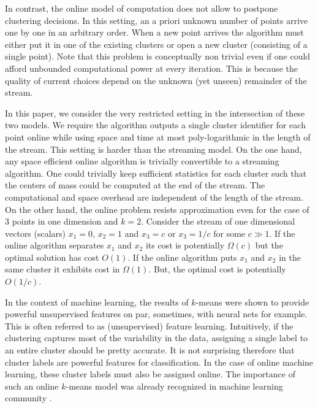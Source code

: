 \documentclass[11pt,twoside]{article}
\begin{document}
In contrast, the online model of computation does not allow to postpone clustering decisions. 
In this setting, an a priori unknown number of points arrive one by one in an arbitrary order.
When a new point arrives the algorithm must either put it in one of the existing clusters or open a new cluster (consisting of a single point). 
Note that this problem is conceptually non trivial even if one could afford unbounded computational power at every iteration.
This is because the quality of current choices depend on the unknown (yet unseen) remainder of the stream.

In this paper, we consider the very restricted setting in the intersection of these two models.
We require the algorithm outputs a single cluster identifier for each point online while using space and time at most poly-logarithmic in the length of the stream.
This setting is harder than the streaming model. 
On the one hand, any space efficient online algorithm is trivially convertible to a streaming algorithm.
One could trivially keep sufficient statistics for each cluster such that the centers of mass could be computed at the end of the stream.
The computational and space overhead are independent of the length of the stream.
On the other hand, the online problem resists approximation even for the case of $3$ points in one dimension and $k=2$.
Consider the stream of one dimensional vectors (scalars) $x_1 = 0$, $x_2 = 1$ and $x_3 = c$ or $x_3 = 1/c$ for some $c \gg 1$.
If the online algorithm separates $x_1$ and $x_2$ its cost is potentially $\Omega(c)$ but the optimal solution has cost $O(1)$. 
If the online algorithm puts $x_1$ and $x_2$ in the same cluster it exhibits cost in $\Omega(1)$. But, the optimal cost is potentially $O(1/c)$. 



In the context of machine learning, the results of $k$-means were shown to provide powerful unsupervised features \cite{CoatesNL11} on par, sometimes, with neural nets for example.
This is often referred to as (unsupervised) feature learning.
Intuitively, if the clustering captures most of the variability in the data, assigning a single label to an entire cluster should be pretty accurate.
It is not surprising therefore that cluster labels are powerful features for classification. 
In the case of online machine learning, these cluster labels must also be assigned online.
The importance of such an online $k$-means model was already recognized in machine learning community \cite{ChoromanskaM12, DasguptaCSE291}.  
\end{document}
